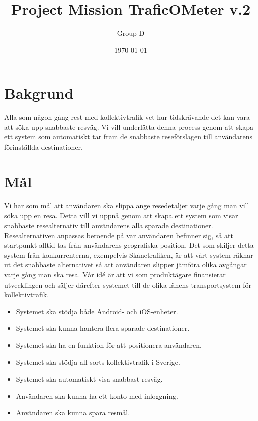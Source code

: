 \documentclass[a4paper]{article}
\title{Project Mission TraficOMeter v.2}
\author{Group D}
\date{\today}
\begin{document}
	\maketitle
	\thispagestyle{empty}
	\setcounter{page}{0}
	\pagebreak
	\tableofcontents
	\pagebreak

	\section{Bakgrund} %
	\label{sec:background}
		Alla som någon gång rest med kollektivtrafik vet hur tidskrävande det kan vara att söka upp
snabbaste resväg. Vi vill underlätta denna process genom att skapa ett system som automatiskt
tar fram de snabbaste reseförslagen till användarens förinställda destinationer.
	

	\section{Mål} %
	\label{sec:m_l}
		Vi har som mål att användaren ska slippa ange resedetaljer varje gång man vill söka upp en resa. Detta vill vi uppnå genom att skapa ett system som visar snabbaste resealternativ till användarens alla sparade destinationer. Resealternativen anpassas beroende på var användaren befinner sig, så att startpunkt alltid tas från användarens geografiska position. Det som skiljer detta system från konkurrenterna, exempelvis Skånetrafiken, är att vårt system räknar ut det snabbaste alternativet så att användaren slipper jämföra olika avgångar varje gång man ska resa. Vår idé är att vi som produktägare finansierar utvecklingen och säljer därefter systemet till de olika länens transportsystem för kollektivtrafik.

		\begin{itemize}
			\item Systemet ska stödja både Android- och iOS-enheter.
			\item Systemet ska kunna hantera flera sparade destinationer.
			\item Systemet ska ha en funktion för att positionera användaren.
			\item Systemet ska stödja all sorts kollektivtrafik i Sverige.
			\item Systemet ska automatiskt visa snabbast resväg.
			\item Användaren ska kunna ha ett konto med inloggning.
			\item Användaren ska kunna spara resmål.
		\end{itemize}
\end{document}
